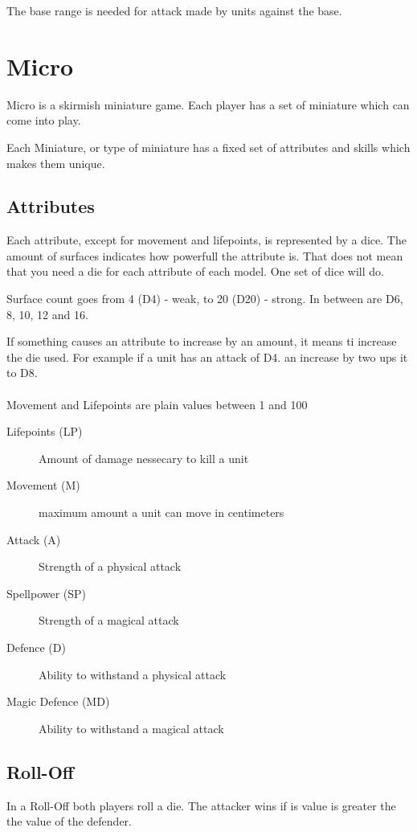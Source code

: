 \documentclass[a5paper,pagesize,10pt,bibtotoc,pointlessnumbers,
normalheadings,DIV=9,twoside=false]{scrbook}
\begin{document}
The base range is needed for attack made by units against the base.


\chapter{Micro}

Micro is a skirmish miniature game. Each player has a set of miniature which can come into play.

Each Miniature, or type of miniature has a fixed set of attributes and skills which makes them unique.

\section{Attributes}
Each attribute, except for movement and lifepoints, is represented by a dice. The amount of surfaces indicates how powerfull the attribute is.
That does not mean that you need a die for each attribute of each model. One set of dice will do.

Surface count goes from 4 (D4) - weak, to 20 (D20) - strong. In between are D6, 8, 10, 12 and 16.

If something causes an attribute to increase by an amount, it means ti increase the die used. For example if a unit has an attack of D4. an increase by two ups it to D8.\\
\\
Movement and Lifepoints are plain values between 1 and 100

\begin{description}
\item[Lifepoints (LP)]
Amount of damage nessecary to kill a unit
\item[Movement (M)]
maximum amount a unit can move in centimeters
\item[Attack (A)]
Strength of a physical attack
\item[Spellpower (SP)]
Strength of a magical attack
\item[Defence (D)]
Ability to withstand a physical attack
\item[Magic Defence (MD)]
Ability to withstand a magical attack
\end{description}

\section{Roll-Off}
In a Roll-Off both players roll a die. The attacker wins if is value is greater the the value of the defender.
\end{document}
